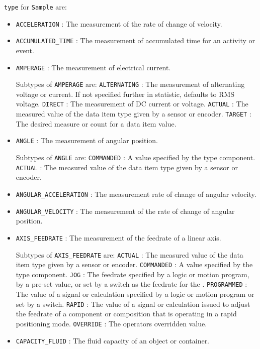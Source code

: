  \texttt{type} for \texttt{Sample} are:
\begin{itemize}

\item \texttt{ACCELERATION} : The measurement of the rate of change of velocity. 

\item \texttt{ACCUMULATED_TIME} : The measurement of accumulated time for an activity or event. 

\item \texttt{AMPERAGE} : The measurement of electrical current. 

Subtypes of \texttt{AMPERAGE} are: 
\newline\tab \texttt{ALTERNATING} : The measurement of alternating voltage or current.   If not specified further in statistic, defaults to RMS voltage.  
\newline\tab \texttt{DIRECT} : The measurement of DC current or voltage. 
\newline\tab \texttt{ACTUAL} : The measured value of the data item type given by a sensor or encoder. 
\newline\tab \texttt{TARGET} : The desired measure or count for a data item value. 
\item \texttt{ANGLE} : The measurement of angular position. 

Subtypes of \texttt{ANGLE} are: 
\newline\tab \texttt{COMMANDED} : A value specified by the  type component. 
\newline\tab \texttt{ACTUAL} : The measured value of the data item type given by a sensor or encoder. 
\item \texttt{ANGULAR_ACCELERATION} : The measurement rate of change of angular velocity. 

\item \texttt{ANGULAR_VELOCITY} : The measurement of the rate of change of angular position. 

\item \texttt{AXIS_FEEDRATE} : The measurement of the feedrate of a linear axis. 

Subtypes of \texttt{AXIS_FEEDRATE} are: 
\newline\tab \texttt{ACTUAL} : The measured value of the data item type given by a sensor or encoder. 
\newline\tab \texttt{COMMANDED} : A value specified by the  type component. 
\newline\tab \texttt{JOG} : The feedrate specified by a logic or motion program, by a pre-set value, or set by a switch as the feedrate for the .  
\newline\tab \texttt{PROGRAMMED} : The value of a signal or calculation specified by a logic or motion program or set by a switch. 
\newline\tab \texttt{RAPID} : The value of a signal or calculation issued to adjust the feedrate of a component or composition that is operating in a rapid positioning mode. 
\newline\tab \texttt{OVERRIDE} : The operators overridden value. 
\item \texttt{CAPACITY_FLUID} : The fluid capacity of an object or container. 


\end{itemize}
